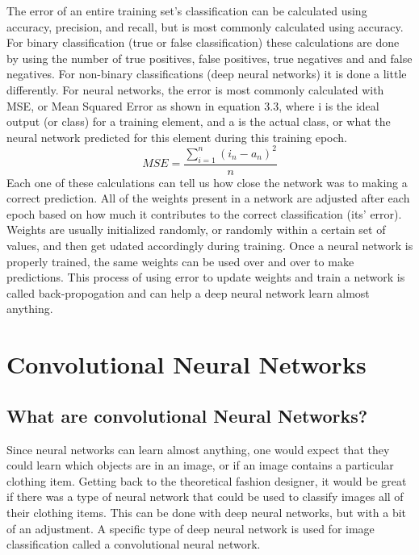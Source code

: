 \documentclass[12pt]{report} %
\begin{document}
	The error of an entire training set's classification can be calculated using accuracy, precision, and recall, but is most commonly calculated using accuracy.  For binary classification (true or false classification) these calculations are done by using the number of true positives, false positives, true negatives and and false negatives. For non-binary classifications (deep neural networks) it is done a little differently. For neural networks, the error is most commonly calculated with MSE, or Mean Squared Error as shown in equation 3.3, where i is the ideal output (or class) for a training element, and a is the actual class, or what the neural network predicted for this element during this training epoch\cite{errorHeaton}.
\begin{equation}
MSE = \frac{\sum\limits_{i=1}^n (i_{n} - a_{n})^2}{n}
\end{equation}		
	Each one of these calculations can tell us how close the network was to making a correct prediction. All of the weights present in a network are adjusted after each epoch based on how much it contributes to the correct classification (its' error). Weights are usually initialized randomly, or randomly within a certain set of values, and then get udated accordingly during training\cite{errorHeaton}. Once a neural network is properly trained, the same weights can be used over and over to make predictions. This process of using error to update weights and train a network is called back-propogation and can help a deep neural network learn almost anything.\cite{KubatMachineLearn} 
	
\chapter{Convolutional Neural Networks}
\section{What are convolutional Neural Networks?}
	Since neural networks can learn almost anything, one would expect that they could learn which objects are in an image, or if an image contains a particular clothing item. Getting back to the theoretical fashion designer, it would be great if there was a type of neural network that could be used to classify images all of their clothing items. This can be done with deep neural networks, but with a bit of an adjustment. A specific type of deep neural network is used for image classification called a convolutional neural network. 
\end{document}
